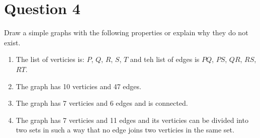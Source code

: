 \documentclass[11pt]{article}
\begin{document}
\section*{Question 4}
Draw a simple graphs with the following properties or explain why they do not
exist.

\begin{enumerate}[label= (\alph*)]
  \item The list of verticies is: $P$, $Q$, $R$, $S$, $T$ and teh list of edges
    is $PQ$, $PS$, $QR$, $RS$, $RT$.

  \item The graph has 10 verticies and 47 edges.

  \item The graph has 7 verticies and 6 edges and is connected.

  \item The graph has 7 verticies and 11 edges and its verticies can be divided
    into two sets in such a way that no edge joins two verticies in the same
    set.

\end{enumerate}
\end{document}
